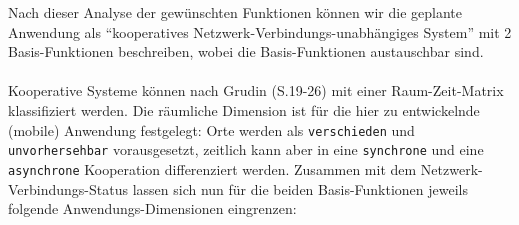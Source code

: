 \vspace{1ex}\noindent
Nach dieser Analyse der gewünschten Funktionen können wir die geplante Anwendung als "`kooperatives Netzwerk-Verbindungs-unabhängiges System"' mit 2 Basis-Funktionen beschreiben, wobei die Basis-Funktionen austauschbar sind.\\ \\
Kooperative Systeme können nach Grudin\cite{GRUDIN:CSCW} (S.19-26) mit einer Raum-Zeit-Matrix klassifiziert werden. Die räumliche Dimension ist für die hier zu entwickelnde (mobile) Anwendung festgelegt: Orte werden als \texttt{verschieden} und \texttt{unvorhersehbar} vorausgesetzt, zeitlich kann aber in eine \texttt{synchrone} und eine \texttt{asynchrone} Kooperation differenziert werden. Zusammen mit dem Netzwerk-Verbindungs-Status lassen sich nun für die beiden Basis-Funktionen jeweils folgende Anwendungs-Dimensionen eingrenzen:\\
\enlargethispage{3\baselineskip} %
